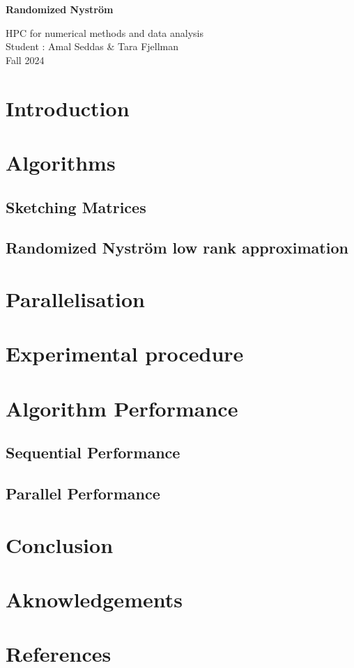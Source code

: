 \documentclass[a4paper, 12pt,oneside]{article}
\begin{document}
 
	\begin{center}
	    \Large
	    \textbf{Randomized Nyström}
	        
	    \vspace{0.4cm}
	    \large
		HPC for numerical methods and data analysis \\
	    Student : Amal Seddas \& Tara Fjellman \\
	    \small{Fall 2024}
	\end{center}
	\section{Introduction}
	\section{Algorithms}
        \subsection{Sketching Matrices}
        \subsection{Randomized Nyström low rank approximation}
	\section{Parallelisation}
	\section{Experimental procedure}
	\section{Algorithm Performance}
        \subsection{Sequential Performance}
        \subsection{Parallel Performance}
	\section{Conclusion}
	\section*{Aknowledgements}
	\section*{References}
\end{document}
